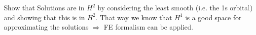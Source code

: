 Show that Solutions are in $H^2$ by considering
the least smooth (i.e. the 1s orbital) and showing that this
is in $H^2$.
That way we know that $H^1$ is a good space for approximating the solutions
$\Rightarrow$ FE formalism can be applied.





